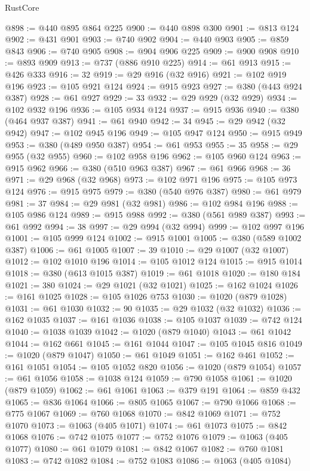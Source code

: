 \begin{lexlean}{RustCore}
\begin{coremodule}
@898 := @440 @895 @864 @225
@900 := @440 @898 @300
@901 := @813 @124
@902 := @431 @901
@903 := @740 @902
@904 := @440 @903
@905 := @859 @843
@906 := @740 @905
@908 := @904 @906 @225
@909 := @900 @908
@910 := @893 @909
@913 := @737 (@886 @910 @225)
@914 := @61 @913
@915 := @426 @333
@916 := 32
@919 := @29 @916 (@32 @916)
@921 := @102 @919 @196
@923 := @105 @921 @124
@924 := @915 @923
@927 := @380 (@443 @924 @387)
@928 := @61 @927
@929 := 33
@932 := @29 @929 (@32 @929)
@934 := @102 @932 @196
@936 := @105 @934 @124
@937 := @915 @936
@940 := @380 (@464 @937 @387)
@941 := @61 @940
@942 := 34
@945 := @29 @942 (@32 @942)
@947 := @102 @945 @196
@949 := @105 @947 @124
@950 := @915 @949
@953 := @380 (@489 @950 @387)
@954 := @61 @953
@955 := 35
@958 := @29 @955 (@32 @955)
@960 := @102 @958 @196
@962 := @105 @960 @124
@963 := @915 @962
@966 := @380 (@510 @963 @387)
@967 := @61 @966
@968 := 36
@971 := @29 @968 (@32 @968)
@973 := @102 @971 @196
@975 := @105 @973 @124
@976 := @915 @975
@979 := @380 (@540 @976 @387)
@980 := @61 @979
@981 := 37
@984 := @29 @981 (@32 @981)
@986 := @102 @984 @196
@988 := @105 @986 @124
@989 := @915 @988
@992 := @380 (@561 @989 @387)
@993 := @61 @992
@994 := 38
@997 := @29 @994 (@32 @994)
@999 := @102 @997 @196
@1001 := @105 @999 @124
@1002 := @915 @1001
@1005 := @380 (@589 @1002 @387)
@1006 := @61 @1005
@1007 := 39
@1010 := @29 @1007 (@32 @1007)
@1012 := @102 @1010 @196
@1014 := @105 @1012 @124
@1015 := @915 @1014
@1018 := @380 (@613 @1015 @387)
@1019 := @61 @1018
@1020 := @180 @184
@1021 := 380
@1024 := @29 @1021 (@32 @1021)
@1025 := @162 @1024
@1026 := @161 @1025
@1028 := @105 @1026 @753
@1030 := @1020 (@879 @1028)
@1031 := @61 @1030
@1032 := 90
@1035 := @29 @1032 (@32 @1032)
@1036 := @162 @1035
@1037 := @161 @1036
@1038 := @105 @1037
@1039 := @742 @124
@1040 := @1038 @1039
@1042 := @1020 (@879 @1040)
@1043 := @61 @1042
@1044 := @162 @661
@1045 := @161 @1044
@1047 := @105 @1045 @816
@1049 := @1020 (@879 @1047)
@1050 := @61 @1049
@1051 := @162 @461
@1052 := @161 @1051
@1054 := @105 @1052 @820
@1056 := @1020 (@879 @1054)
@1057 := @61 @1056
@1058 := @1038 @124
@1059 := @790 @1058
@1061 := @1020 (@879 @1059)
@1062 := @61 @1061
@1063 := @379 @191
@1064 := @859 @432
@1065 := @836 @1064
@1066 := @805 @1065
@1067 := @790 @1066
@1068 := @775 @1067
@1069 := @760 @1068
@1070 := @842 @1069
@1071 := @752 @1070
@1073 := @1063 (@405 @1071)
@1074 := @61 @1073
@1075 := @842 @1068
@1076 := @742 @1075
@1077 := @752 @1076
@1079 := @1063 (@405 @1077)
@1080 := @61 @1079
@1081 := @842 @1067
@1082 := @760 @1081
@1083 := @742 @1082
@1084 := @752 @1083
@1086 := @1063 (@405 @1084)

\end{coremodule}
\end{lexlean}

